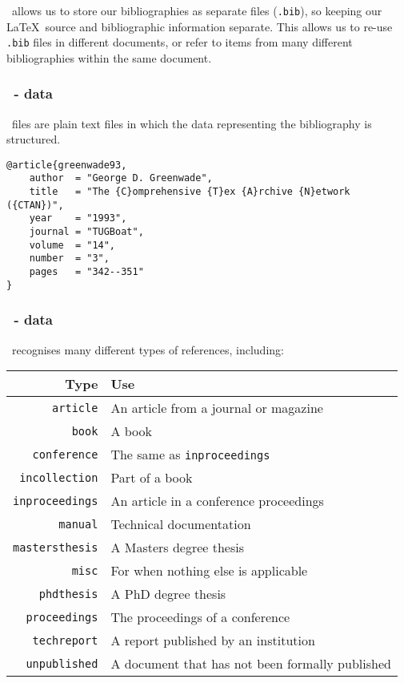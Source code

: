 \documentclass[mathserif]{beamer}
\begin{document}
\begin{frame}[fragile]
\frametitle{\BibTeX}
\vfill
\BibTeX\ allows us to store our bibliographies as separate files (\texttt{.bib}), so keeping our \LaTeX\ source and bibliographic information separate.
\vfill
This allows us to re-use \texttt{.bib} files in different documents, or refer to items from many different bibliographies  within the same document.
\vfill
\end{frame}

\begin{frame}[fragile]
\frametitle{\BibTeX\ - data}
\vfill
\BibTeX\ files are plain text files in which the data representing the bibliography is structured.
\vfill
\begin{lstlisting}[style=latexsty]
@article{greenwade93,
    author  = "George D. Greenwade",
    title   = "The {C}omprehensive {T}ex {A}rchive {N}etwork ({CTAN})",
    year    = "1993",
    journal = "TUGBoat",
    volume  = "14",
    number  = "3",
    pages   = "342--351"
}
\end{lstlisting}
\vfill
\end{frame}


\begin{frame}[fragile]
\frametitle{\BibTeX\ - data}
\vfill
\BibTeX\ recognises many different types of references, including:
\vfill
\begin{center}
	\begin{tabular}{r | l }
		Type & Use \\
		\hline
		\texttt{article} & An article from a journal or magazine \\
		\texttt{book} & A book \\
		\texttt{conference} & The same as \texttt{inproceedings} \\
		\texttt{incollection} & Part of a book \\
		\texttt{inproceedings} & An article in a conference proceedings \\
		\texttt{manual} & Technical documentation \\		
		\texttt{mastersthesis} & A Masters degree thesis \\
		\texttt{misc} & For when nothing else is applicable \\
		\texttt{phdthesis} & A PhD degree thesis \\
		\texttt{proceedings} & The proceedings of a conference \\		
		\texttt{techreport} & A report published by an institution \\
		\texttt{unpublished} & A document that has not been formally published \\
	\end{tabular}
\end{center}
\vfill
\end{frame}
\end{document}
